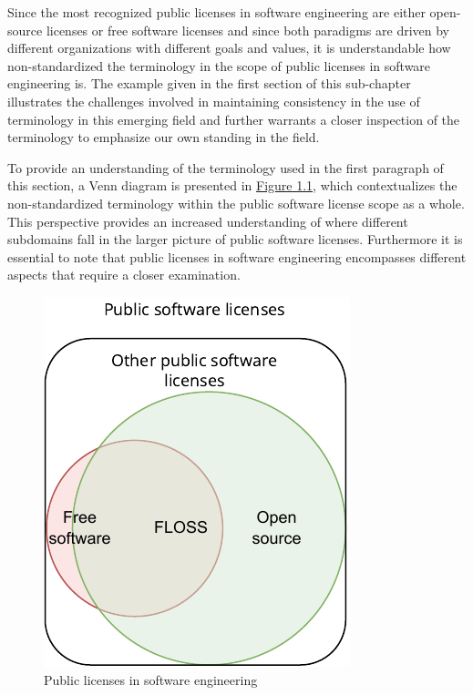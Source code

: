 Since the most recognized public licenses in software engineering are either open-source licenses or free software licenses and since both paradigms are driven by different organizations with different goals and values, it is understandable how non-standardized the terminology in the scope of public licenses in software engineering is. The example given in the first section of this sub-chapter illustrates the challenges involved in maintaining consistency in the use of terminology in this emerging field and further warrants a closer inspection of the terminology to emphasize our own standing in the field.

To provide an understanding of the terminology used in the first paragraph of this section, a Venn diagram is presented in \hyperref[fig:terms]{Figure 1.1}, which contextualizes the non-standardized terminology within the public software license scope as a whole. This perspective provides an increased understanding of where different subdomains fall in the larger picture of public software licenses. Furthermore it is essential to note that public licenses in software engineering encompasses different aspects that require a closer examination. 
\begin{figure}[t]
	\centering
	\includegraphics[scale=1.5]{figures/terms-diagram.pdf}
	\caption{Public licenses in software engineering}
	\label{fig:terms}
\end{figure}

